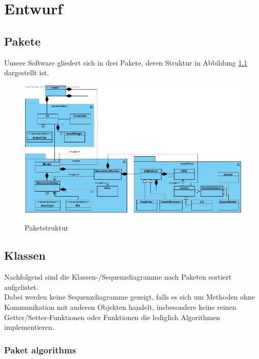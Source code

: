 \chapter{Entwurf}
\section{Pakete}
Unsere Software gliedert sich in drei Pakete, deren Struktur in Abbildung \ref{Paketdiagramm} dargestellt ist.

\begin{figure}[H]
	\centering
	\includegraphics[scale=.62]{Bilder/Paketdiagramm.jpg}\\
	\caption{Paketstruktur}
	\label{Paketdiagramm}
\end{figure}

\newpage
\section{Klassen}

Nachfolgend sind die Klassen-/Sequenzdiagramme nach Paketen sortiert aufgelistet. \\
Dabei werden keine Sequenzdiagramme gezeigt, falls es sich um Methoden ohne Kommunikation mit anderen Objekten handelt, insbesondere keine reinen Getter/Setter-Funktionen oder Funktionen die lediglich Algorithmen implementieren.

\subsection{Paket algorithms}

